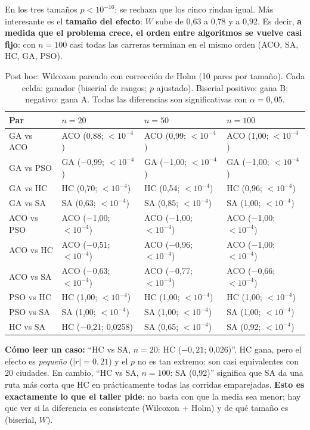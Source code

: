 \documentclass[11pt,a4paper]{article}
\begin{document}
En los tres tamaños $p<10^{-16}$: se rechaza que los cinco rindan igual. Más interesante es el \textbf{tamaño del efecto}: $W$ sube de 0{,}63 a 0{,}78 y a 0{,}92.
Es decir, \textbf{a medida que el problema crece, el orden entre algoritmos se vuelve casi fijo}: con $n=100$ casi todas las carreras terminan en el mismo orden
(ACO, SA, HC, GA, PSO).

\begin{table}[H]\centering\small
\begin{tabular}{llll}
\toprule
Par & $n=20$ & $n=50$ & $n=100$ \\
\midrule
GA vs ACO & ACO (0{,}88; $<10^{-4}$) & ACO (0{,}99; $<10^{-4}$) & ACO (1{,}00; $<10^{-4}$) \\
GA vs PSO & GA ($-$0{,}99; $<10^{-4}$) & GA ($-$1{,}00; $<10^{-4}$) & GA ($-$1{,}00; $<10^{-4}$) \\
GA vs HC & HC (0{,}70; $<10^{-4}$) & HC (0{,}54; $<10^{-4}$) & HC (0{,}96; $<10^{-4}$) \\
GA vs SA & SA (0{,}63; $<10^{-4}$) & SA (0{,}85; $<10^{-4}$) & SA (1{,}00; $<10^{-4}$) \\
ACO vs PSO & ACO ($-$1{,}00; $<10^{-4}$) & ACO ($-$1{,}00; $<10^{-4}$) & ACO ($-$1{,}00; $<10^{-4}$) \\
ACO vs HC & ACO ($-$0{,}51; $<10^{-4}$) & ACO ($-$0{,}96; $<10^{-4}$) & ACO ($-$1{,}00; $<10^{-4}$) \\
ACO vs SA & ACO ($-$0{,}63; $<10^{-4}$) & ACO ($-$0{,}77; $<10^{-4}$) & ACO ($-$0{,}66; $<10^{-4}$) \\
PSO vs HC & HC (1{,}00; $<10^{-4}$) & HC (1{,}00; $<10^{-4}$) & HC (1{,}00; $<10^{-4}$) \\
PSO vs SA & SA (1{,}00; $<10^{-4}$) & SA (1{,}00; $<10^{-4}$) & SA (1{,}00; $<10^{-4}$) \\
HC vs SA & HC ($-$0{,}21; 0{,}0258) & SA (0{,}65; $<10^{-4}$) & SA (0{,}92; $<10^{-4}$) \\
\bottomrule
\end{tabular}

\caption{Post hoc: Wilcoxon pareado con corrección de Holm (10 pares por tamaño). Cada celda: ganador (biserial de rangos; $p$ ajustado).
Biserial positivo: gana B; negativo: gana A. Todas las diferencias son significativas con $\alpha=0{,}05$.}
\end{table}

\textbf{Cómo leer un caso:} ``HC vs SA, $n=20$: HC ($-0{,}21$; 0{,}026)''. HC gana, pero el efecto es \emph{pequeño} ($|r|=0{,}21$) y el $p$ no es tan extremo:
son casi equivalentes con 20 ciudades. En cambio, ``HC vs SA, $n=100$: SA (0{,}92)'' significa que SA da una ruta más corta que HC en prácticamente
todas las corridas emparejadas. \textbf{Esto es exactamente lo que el taller pide}: no basta con que la media sea menor; hay que ver si la diferencia es
consistente (Wilcoxon + Holm) y de qué tamaño es (biserial, $W$).
\end{document}
